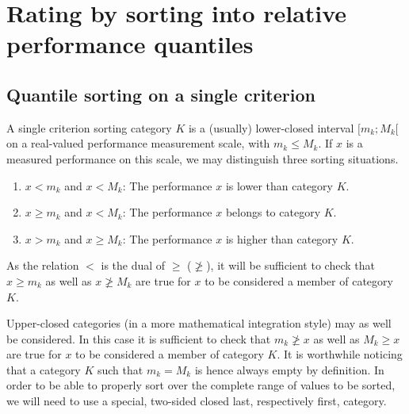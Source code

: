 \chapter{Rating by sorting into relative performance quantiles}
\label{sec:9}



\section{Quantile sorting on a single criterion}
\label{sec:9.1}

A single criterion sorting category $K$ is a (usually) lower-closed interval $[m_k ; M_k[$ on a real-valued performance measurement scale, with $m_k \leq M_k$. If $x$ is a measured performance on this scale, we may distinguish three sorting situations.
\begin{enumerate}[leftmargin=1cm,rightmargin=0.5cm]
\item $x < m_k$ and $x < M_k$: The performance $x$ is lower than category $K$.
\item $x \geqslant m_k$ and $x < M_k$: The performance $x$ belongs to category $K$.
\item $x > m_k$ and $x \geqslant M_k$: The performance $x$ is higher than category $K$.
\end{enumerate}

As the relation $<$ is the dual of $\geqslant$ ($\not\geqslant$), it will be sufficient to check that $x \geqslant m_k$ as well as $x \not\geqslant M_k$ are true for $x$ to be considered a member of category $K$.

Upper-closed categories (in a more mathematical integration style) may as well be considered. In this case it is sufficient to check that $m_k \not\geqslant x$ as well as $M_k \geq x$ are true for $x$ to be considered a member of category $K$. It is worthwhile noticing that a category $K$ such that $m_k = M_k$ is hence always empty by definition. In order to be able to properly sort over the complete range of values to be sorted, we will need to use a special, two-sided closed last, respectively first, category.

